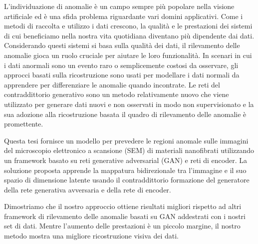 
\begingroup

L'individuazione di anomalie è un campo sempre più popolare nella visione artificiale ed è una sfida
problema riguardante vari domini applicativi. Come i metodi di raccolta e utilizzo
i dati crescono, la qualità e le prestazioni dei sistemi di cui beneficiamo nella nostra vita quotidiana diventano
più dipendente dai dati. Considerando questi sistemi si basa sulla qualità dei dati, il rilevamento delle anomalie
gioca un ruolo cruciale per aiutare le loro funzionalità. In scenari in cui i dati anormali sono un evento raro
o semplicemente costosi da osservare, gli approcci basati sulla ricostruzione sono usati per modellare i dati normali da apprendere
per differenziare le anomalie quando incontrate. Le reti del contraddittorio generativo sono un metodo relativamente nuovo
che viene utilizzato per generare dati nuovi e non osservati in modo non supervisionato e la sua adozione alla ricostruzione basata
il quadro di rilevamento delle anomalie è promettente.

Questa tesi fornisce un modello per prevedere le regioni anomale sulle immagini del microscopio elettronico a scansione (SEM)
di materiali nanofibrati utilizzando un framework basato su reti generative adversarial (GAN) e reti di encoder.
La soluzione proposta apprende la mappatura bidirezionale tra l'immagine e il suo spazio di dimensione latente usando il contraddittorio
formazione del generatore della rete generativa avversaria e della rete di encoder.

Dimostriamo che il nostro approccio ottiene risultati migliori rispetto ad altri framework di rilevamento delle anomalie basati su GAN addestrati con i nostri
set di dati. Mentre l'aumento delle prestazioni è un piccolo margine, il nostro metodo mostra una migliore ricostruzione visiva dei dati.

\endgroup